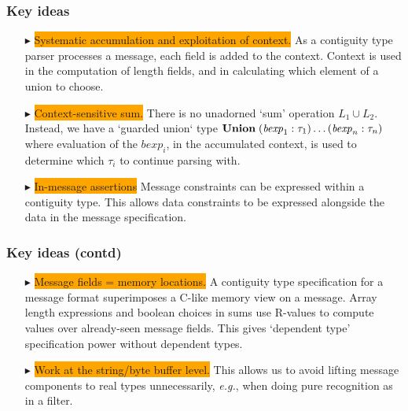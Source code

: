 \documentclass{beamer}
\newcommand{\eg}{\textit{e.g.}}
\newcommand{\kemph}[1]{\colorbox{orange}{#1}}
\newcommand{\konst}[1]{\ensuremath{\mbox{\bf{#1}}}}
\begin{document}
\begin{frame}\frametitle{Key ideas}

\begin{itemize}

\item [$\blacktriangleright$] \kemph{Systematic accumulation and
  exploitation of context.} As a contiguity type parser processes a
  message, each field is added to the context. Context is
  used in the computation of length fields, and in calculating which
  element of a union to choose.

\item [$\blacktriangleright$] \kemph{Context-sensitive sum.} There is
  no unadorned `sum' operation $L_1 \cup L_2$. Instead, we have a
  `guarded union` type
  $\konst{Union}\; (\mathit{bexp}_1 : \tau_1) \ldots (\mathit{bexp}_n : \tau_n)$
  where evaluation of the $\mathit{bexp}_i$, in the accumulated
  context, is used to determine which $\tau_i$ to continue parsing
  with.

\item [$\blacktriangleright$] \kemph{In-message assertions} Message
  constraints can be expressed within a contiguity type. This allows
  data constraints to be expressed alongside the data in the message
  specification.

\end{itemize}
\end{frame}

\begin{frame}\frametitle{Key ideas (contd)}

\begin{itemize}

\item [$\blacktriangleright$] \kemph{Message fields = memory
  locations.}  A contiguity type specification for a message format
  superimposes a C-like memory view on a message. Array length
  expressions and boolean choices in sums use R-values to compute
  values over already-seen message fields. This gives `dependent type'
  specification power without dependent types.

\item [$\blacktriangleright$] \kemph{Work at the string/byte buffer
  level.}  This allows us to avoid lifting message components to real
  types unnecessarily, \eg, when doing pure recognition as in a
  filter.

\end{itemize}
\end{frame}
\end{document}
